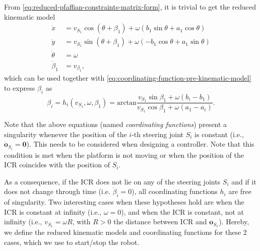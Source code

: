 From \eqref{eq:reduced-pfaffian-constraints-matrix-form}, it is trivial to
get the reduced kinematic model
\begin{equation}
\label{eq:reduced-kinematic-model}
\begin{split}
    \dot{x} &= v_{S_1} \cos(\theta + \beta_1) + \omega (b_1 \sin\theta + a_1 \cos\theta) \\
    \dot{y} &= v_{S_1} \sin(\theta + \beta_1) + \omega (-b_1 \cos\theta + a_1 \sin\theta) \\
    \dot{\theta} &= \omega \\
    \dot{\beta}_1 &= v_{\beta_1},
\end{split}
\end{equation}
which can be used together with \eqref{eq:coordinating-function-pre-kinematic-model}
to express $\beta_i$ as
\begin{equation}
    \label{eq:coordinating-function-post-kinematic-model}
    \beta_i = h_i(v_{S_1}, \omega, \beta_1) = \mathrm{arctan} \frac{v_{S_1}\sin\beta_1+\omega(b_i-b_1)}{v_{S_1}\cos\beta_1+\omega(a_1-a_i)}.
\end{equation}

Note that the above equations (named \textit{coordinating functions}) present a singularity whenever the position of the $i$-th steering joint $S_i$ is constant (i.e., $\dot{\bm{o}}_{S_i}=\bm{0}$). This needs to be considered when designing a controller. Note that this condition is met when the platform is not moving or when the position of the ICR coincides with the position of $S_i$. 

As a consequence, if the ICR does not lie on any of the steering joints $S_i$
and if it does not change through time (i.e. $\dot{\beta}_i = 0$), all
coordinating functions $h_i$ are free of singularity. Two interesting cases when
these hypotheses hold are when the ICR is constant at infinity
(i.e., $\omega = 0$), and when the ICR is constant, not at infinity
(i.e., $v_{S_1} = \omega R$, with $R > 0$ the distance between ICR and
$\bm{o}_{S_1}$). Hereby, we define the reduced kinematic models and coordinating
functions for these 2 cases, which we use to start/stop the robot.

